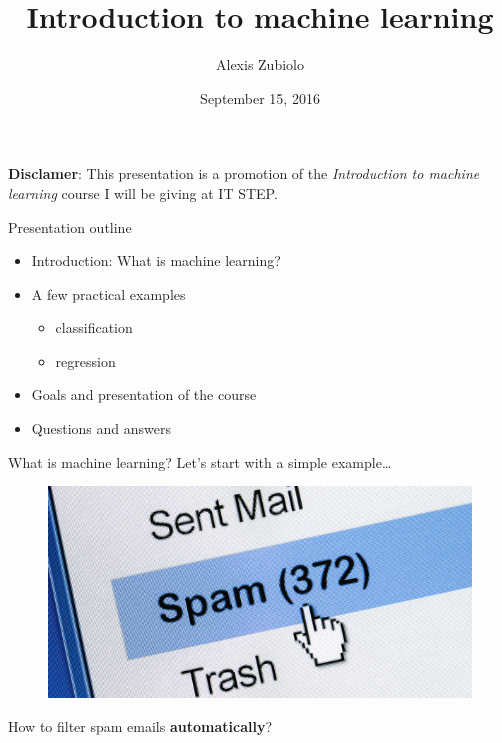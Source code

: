 \documentclass{beamer}
\title[Course presentation]{Introduction to machine learning}
\author{Alexis Zubiolo}
\institute{Adcash Bulgaria}
\date{September 15, 2016}
\begin{document}
\begin{frame}
  \titlepage
\end{frame}


\begin{frame}
\vfill
\textbf{Disclamer}: This presentation is a promotion of the \textit{Introduction to machine learning} course I will be giving at IT STEP.
\vfill
\end{frame}

\begin{frame}{Presentation outline}

\vfill
\begin{itemize}
  \item Introduction: What is machine learning?
\vfill
  \item A few practical examples
  \begin{itemize}
  	\item classification
  	\item regression
  \end{itemize}
\vfill
  \item Goals and presentation of the course 
\vfill
  \item Questions and answers
\end{itemize}
\vfill

\end{frame}

\begin{frame}{What is machine learning?}
\vfill
Let's start with a simple example\ldots
\vfill
\begin{figure}
\centering
\includegraphics[width=\textwidth]{images/spam.jpg}
\end{figure}
\vfill
How to filter spam emails \textbf{automatically}?
\vfill
\end{frame}
\end{document}

